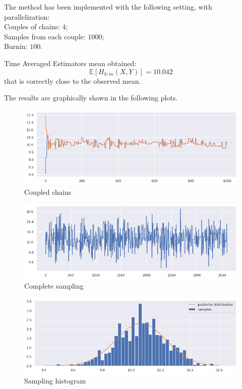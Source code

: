 \documentclass {article}
\begin{document}
The method has been implemented with the following setting, with parallelization:\\
Couples of chains: $4$;\\
Samples from each couple: $1000$;\\
Burnin: $100$.


Time Averaged Estimators mean obtained:
$$ 
	\mathbb{E}[H_{k:m}(X,Y)] = 10.042
$$
that is correctly close to the observed mean.
		
The results are graphically shown in the following plots.

	\begin{figure}[h!]
		\centering
		\includegraphics[width=\textwidth]{immagini_coupling/2_catene_coupling}	
		\caption{Coupled chains}
		\label{coupl1}
	\end{figure}

	\begin{figure}[h!]
		\centering
		\includegraphics[width=\textwidth]{immagini_coupling/traceplot_coupling}
		\caption{Complete sampling}
		\label{coupl2}
	\end{figure}

	\begin{figure}[h!]
		\centering
		\includegraphics[width=\textwidth]{immagini_coupling/hist_coupling}
		\caption{Sampling histogram}
		\label{coupl3}
	\end{figure}
\end{document}
